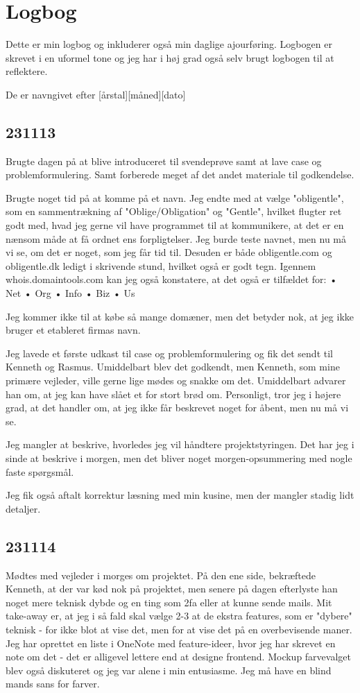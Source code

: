 \documentclass{report}
\begin{document}
\chapter{Logbog}

Dette er min logbog og inkluderer også min daglige ajourføring.
Logbogen er skrevet i en uformel tone og jeg har i høj grad også selv brugt logbogen til at reflektere.\par{}
De er navngivet efter [årstal][måned][dato]

\section{231113}

Brugte dagen på at blive introduceret til svendeprøve samt at lave case og problemformulering. Samt forberede meget af det andet materiale til godkendelse.
 
Brugte noget tid på at komme på et navn. Jeg endte med at vælge "obligentle", som en sammentrækning af "Oblige/Obligation" og "Gentle", hvilket flugter ret godt med, hvad jeg gerne vil have programmet til at kommunikere, at det er en nænsom måde at få ordnet ens forpligtelser. Jeg burde teste navnet, men nu må vi se, om det er noget, som jeg får tid til.
Desuden er både obligentle.com og obligentle.dk ledigt i skrivende stund, hvilket også er godt tegn.
Igennem whois.domaintools.com kan jeg også konstatere, at det også er tilfældet for:
•	Net
•	Org
•	Info
•	Biz
•	Us
 
Jeg kommer ikke til at købe så mange domæner, men det betyder nok, at jeg ikke bruger et etableret firmas navn.
 
Jeg lavede et første udkast til case og problemformulering og fik det  sendt til Kenneth og Rasmus.
Umiddelbart blev det godkendt, men Kenneth, som mine primære vejleder, ville gerne lige mødes og snakke om det. Umiddelbart advarer han om, at jeg kan have slået et for stort brød om. Personligt, tror jeg i højere grad, at det handler om, at jeg ikke får beskrevet noget for åbent, men nu må vi se.
 
Jeg mangler at beskrive, hvorledes jeg vil håndtere projektstyringen. Det har jeg i sinde at beskrive i morgen, men det bliver noget morgen-opsummering med nogle faste spørgsmål.
 
Jeg fik også aftalt korrektur læsning med min kusine, men der mangler stadig lidt detaljer.

\section{231114}
Mødtes med vejleder i morges om projektet. På den ene side, bekræftede Kenneth, at der var kød nok på projektet, men senere på dagen efterlyste han noget mere teknisk dybde og en ting som 2fa eller at kunne sende mails.
Mit take-away er, at jeg i så fald skal vælge 2-3 at de ekstra features, som er "dybere" teknisk - for ikke blot at vise det, men for at vise det på en overbevisende maner. Jeg har oprettet en liste i OneNote med feature-ideer, hvor jeg har skrevet en note om det - det er alligevel lettere end at designe frontend.
Mockup farvevalget blev også diskuteret og jeg var alene i min entusiasme. Jeg må have en blind mands sans for farver.
 
\end{document}
